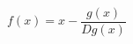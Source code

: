 \documentclass[12pt]{amsart}
\begin{document}
\sicpsize
\[
   f(x) = x - \frac{g(x)}{D g(x)}
\]
\end{document}
